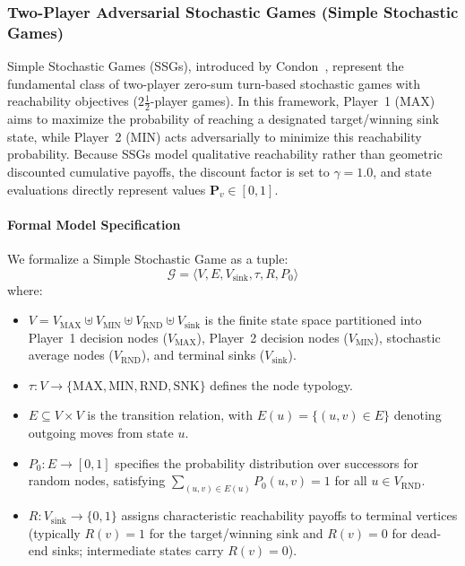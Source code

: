 \documentclass{article}
\begin{document}
\subsubsection{Two-Player Adversarial Stochastic Games (Simple Stochastic Games)}

Simple Stochastic Games (SSGs), introduced by Condon~\cite{Condon:1992:complexity}, represent the fundamental class of two-player zero-sum turn-based stochastic games with reachability objectives ($2\frac{1}{2}$-player games). In this framework, Player~1 ($\text{MAX}$) aims to maximize the probability of reaching a designated target/winning sink state, while Player~2 ($\text{MIN}$) acts adversarially to minimize this reachability probability. Because SSGs model qualitative reachability rather than geometric discounted cumulative payoffs, the discount factor is set to $\gamma = 1.0$, and state evaluations directly represent values $\mathbf{P}_v \in [0, 1]$.

\paragraph{Formal Model Specification}
We formalize a Simple Stochastic Game as a tuple:
\begin{equation}
\mathcal{G} = \langle V, E, V_{\text{sink}}, \tau, R, P_0 \rangle
\end{equation}
where:
\begin{itemize}
    \item $V = V_{\text{MAX}} \uplus V_{\text{MIN}} \uplus V_{\text{RND}} \uplus V_{\text{sink}}$ is the finite state space partitioned into Player~1 decision nodes ($V_{\text{MAX}}$), Player~2 decision nodes ($V_{\text{MIN}}$), stochastic average nodes ($V_{\text{RND}}$), and terminal sinks ($V_{\text{sink}}$).
    \item $\tau : V \to \{\text{MAX}, \text{MIN}, \text{RND}, \text{SNK}\}$ defines the node typology.
    \item $E \subseteq V \times V$ is the transition relation, with $E(u) = \{(u, v) \in E\}$ denoting outgoing moves from state $u$.
    \item $P_0 : E \to [0, 1]$ specifies the probability distribution over successors for random nodes, satisfying $\sum_{(u, v) \in E(u)} P_0(u, v) = 1$ for all $u \in V_{\text{RND}}$.
    \item $R : V_{\text{sink}} \to \{0, 1\}$ assigns characteristic reachability payoffs to terminal vertices (typically $R(v) = 1$ for the target/winning sink and $R(v) = 0$ for dead-end sinks; intermediate states carry $R(v) = 0$).
\end{itemize}
\end{document}
